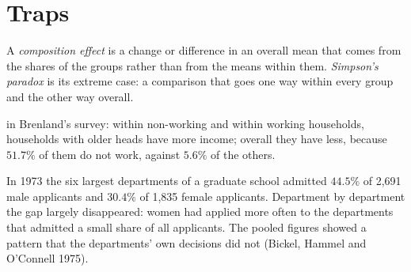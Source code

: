 \section{Traps}\label{sec:b1:describing-data:traps}

\begin{definition}\label{def:b1:describing-data:simpson}
A \emph{composition effect} is a change or difference in an overall mean that
comes from the shares of the groups rather than from the means within
them. \emph{Simpson's paradox} is its extreme case: a comparison that goes one
way within every group and the other way overall.
\end{definition}

\label{lst:b1:describing-data:simpson}

\label{out:b1:describing-data:simpson}

\begin{omfigure}

{\small {} in Brenland's survey: within non-working and within
working households, households with older heads have more income; overall
they have less, because $51.7\%$ of them do not work, against $5.6\%$ of the others.}
\end{omfigure}

\begin{record}
In 1973 the six largest departments of a graduate school admitted $44.5\%$ of
2,691 male applicants and $30.4\%$ of 1,835 female applicants. %
Department by department the gap largely disappeared: women had applied
more often to the departments that admitted a small share of all
applicants. The pooled figures showed a pattern that the departments'
own decisions did not (Bickel, Hammel and O'Connell 1975).
\end{record}

